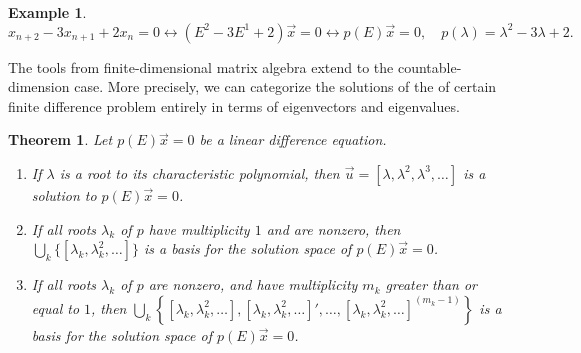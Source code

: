 \documentclass[12pt]{article}
\theoremstyle{plain}
\newtheorem{theorem}{Theorem}
\theoremstyle{definition}
\newtheorem*{example}{Example}
\theoremstyle{remark}
\numberwithin{equation}{section}  %
\begin{document}
\begin{example}
	\begin{equation*}
		x_{n+2} - 3x_{n+1} + 2x_{n} = 0 \longleftrightarrow (E^2 - 3E^1 + 2)\vec{x} = 0
		\longleftrightarrow p(E) \vec{x} = 0, \quad p(\lambda) = \lambda^2 - 3 \lambda
		+2.
	\end{equation*}
\end{example}
The tools from finite-dimensional matrix algebra extend to the
countable-dimension case. More precisely, we can categorize the solutions of the
of certain finite difference problem entirely in terms of eigenvectors and
eigenvalues.
\begin{theorem}
	\label{thm:dif-eq}
	Let $p(E) \vec{x} = 0$ be a linear difference equation. 
	\begin{enumerate}
		\item 
			If $\lambda$ is a root
			to its characteristic polynomial, then $\vec{u} = [\lambda, \lambda^2,
			\lambda^3, \ldots]$ is a solution to $p(E) \vec{x} = 0$. 
		\item 
			If all roots $\lambda_k$ of $p$ have multiplicity $1$ and are nonzero, then
			$ \bigcup_k \{ [\lambda_k, \lambda_k^2, \ldots] \}$ is  
			a basis for the solution space of $p(E) \vec{x} = 0$.	
		\item If all roots $\lambda_k$ of $p$ are nonzero, and have multiplicity $m_k$
			greater than or equal to $1$, then $\bigcup_k \left\{ [\lambda_k, \lambda_k^2,
				\ldots], [\lambda_k, \lambda_k^2, \ldots]', \ldots, [\lambda_k, \lambda_k^2,
			\ldots ]^{(m_k -1)} \right\}$ is a basis for the solution space of $p(E)
			\vec{x} = 0$.
	\end{enumerate}
\end{theorem}
\end{document}

